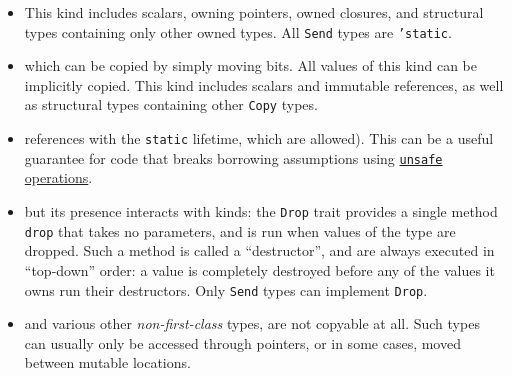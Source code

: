 \documentclass[]{article}
\begin{document}
\begin{itemize}
\item

  This kind includes scalars, owning pointers, owned closures, and
  structural types containing only other owned types. All \texttt{Send}
  types are \texttt{'static}.
\item

  which can be copied by simply moving bits. All values of this kind can
  be implicitly copied. This kind includes scalars and immutable
  references, as well as structural types containing other \texttt{Copy}
  types.
\item

  references with the \texttt{static} lifetime, which are allowed). This
  can be a useful guarantee for code that breaks borrowing assumptions
  using \hyperref[unsafe-functions]{\texttt{unsafe} operations}.
\item

  but its presence interacts with kinds: the \texttt{Drop} trait
  provides a single method \texttt{drop} that takes no parameters, and
  is run when values of the type are dropped. Such a method is called a
  ``destructor'', and are always executed in ``top-down'' order: a value
  is completely destroyed before any of the values it owns run their
  destructors. Only \texttt{Send} types can implement \texttt{Drop}.
\item

  and various other \emph{non-first-class} types, are not copyable at
  all. Such types can usually only be accessed through pointers, or in
  some cases, moved between mutable locations.
\end{itemize}
\end{document}
